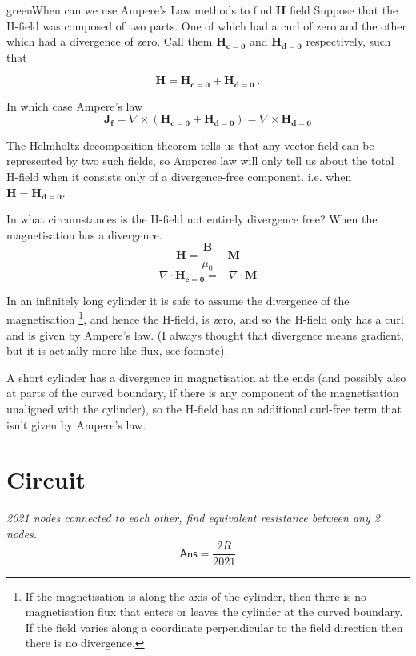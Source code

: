 \begin{mybox}{green}{When can we use Ampere's Law methods to find $\mathbf{H}$ field}
    Suppose that the H-field was composed of two parts. One of which had a curl of zero and the other which had a divergence of zero. Call them $\mathbf{H_{c=0}}$ and $\mathbf{H_{d=0}}$ respectively, such that

    $$\mathbf{H} = \mathbf{H_{c=0}} + \mathbf{H_{d=0}}\ .$$

    In which case Ampere's law
    $$\mathbf{J_f}=\nabla \times (\mathbf{H_{c=0}} + \mathbf{H_{d=0}})=\nabla \times \mathbf{H_{d=0}}$$

    The Helmholtz decomposition theorem tells us that any vector field can be represented by two such fields, so Amperes law will only tell us about the total H-field when it consists only of a divergence-free component. i.e. when $\mathbf{H}=\mathbf{H_{d=0}}$.

    In what circumstances is the H-field not entirely divergence free? When the magnetisation has a divergence.
    $$\mathbf{H}=\frac{\mathbf{B}}{\mu_0}-\mathbf{M}$$
    $$\nabla \cdot \mathbf{H_{c=0}} = - \nabla \cdot \mathbf{M}$$
\end{mybox}
In an infinitely long cylinder it is safe to assume the divergence of the magnetisation \footnote{ If the magnetisation is along the axis of the cylinder, then there is no magnetisation flux that enters or leaves the cylinder at the curved boundary. If the field varies along a coordinate perpendicular to the field direction then there is no divergence.}, and hence the H-field, is zero, and so the H-field only has a curl and is given by Ampere's law. (I always thought that divergence means gradient, but it is actually more like flux, see foonote).

A short cylinder has a divergence in magnetisation at the ends (and possibly also at parts of the curved boundary, if there is any component of the magnetisation unaligned with the cylinder), so the H-field has an additional curl-free term that isn't given by Ampere's law.

\section{Circuit}
\textit{2021 nodes connected to each other, find equivalent resistance between any 2 nodes.}
\begin{equation}
    \boxed{\textsf{Ans}=\frac{2R}{2021}}\nonumber
\end{equation}



